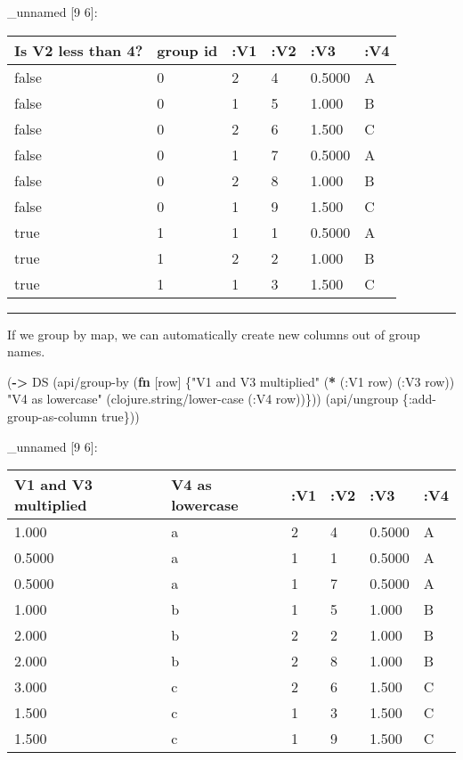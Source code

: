 \documentclass[]{article}
\newenvironment{Shaded}{\begin{snugshade}}{\end{snugshade}}
\newcommand{\KeywordTok}[1]{\textcolor[rgb]{0.13,0.29,0.53}{\textbf{#1}}}
\newcommand{\StringTok}[1]{\textcolor[rgb]{0.31,0.60,0.02}{#1}}
\newcommand{\VariableTok}[1]{\textcolor[rgb]{0.00,0.00,0.00}{#1}}
\newcommand{\AttributeTok}[1]{\textcolor[rgb]{0.77,0.63,0.00}{#1}}
\newcommand{\NormalTok}[1]{#1}
\begin{document}
\_unnamed {[}9 6{]}:

\begin{longtable}[]{@{}llllll@{}}
\toprule
Is V2 less than 4? & group id & :V1 & :V2 & :V3 & :V4\tabularnewline
\midrule
\endhead
false & 0 & 2 & 4 & 0.5000 & A\tabularnewline
false & 0 & 1 & 5 & 1.000 & B\tabularnewline
false & 0 & 2 & 6 & 1.500 & C\tabularnewline
false & 0 & 1 & 7 & 0.5000 & A\tabularnewline
false & 0 & 2 & 8 & 1.000 & B\tabularnewline
false & 0 & 1 & 9 & 1.500 & C\tabularnewline
true & 1 & 1 & 1 & 0.5000 & A\tabularnewline
true & 1 & 2 & 2 & 1.000 & B\tabularnewline
true & 1 & 1 & 3 & 1.500 & C\tabularnewline
\bottomrule
\end{longtable}

\begin{center}\rule{0.5\linewidth}{0.5pt}\end{center}

If we group by map, we can automatically create new columns out of group
names.

\begin{Shaded}
\begin{Highlighting}[]
\NormalTok{(}\KeywordTok{->}\NormalTok{ DS}
\NormalTok{    (api/group-by (}\KeywordTok{fn}\NormalTok{ [row] \{}\StringTok{"V1 and V3 multiplied"}\NormalTok{ (}\KeywordTok{*}\NormalTok{ (}\AttributeTok{:V1}\NormalTok{ row)}
\NormalTok{                                                      (}\AttributeTok{:V3}\NormalTok{ row))}
                            \StringTok{"V4 as lowercase"}\NormalTok{ (clojure.string/lower-case (}\AttributeTok{:V4}\NormalTok{ row))\}))}
\NormalTok{    (api/ungroup \{}\AttributeTok{:add-group-as-column} \VariableTok{true}\NormalTok{\}))}
\end{Highlighting}
\end{Shaded}

\_unnamed {[}9 6{]}:

\begin{longtable}[]{@{}llllll@{}}
\toprule
V1 and V3 multiplied & V4 as lowercase & :V1 & :V2 & :V3 &
:V4\tabularnewline
\midrule
\endhead
1.000 & a & 2 & 4 & 0.5000 & A\tabularnewline
0.5000 & a & 1 & 1 & 0.5000 & A\tabularnewline
0.5000 & a & 1 & 7 & 0.5000 & A\tabularnewline
1.000 & b & 1 & 5 & 1.000 & B\tabularnewline
2.000 & b & 2 & 2 & 1.000 & B\tabularnewline
2.000 & b & 2 & 8 & 1.000 & B\tabularnewline
3.000 & c & 2 & 6 & 1.500 & C\tabularnewline
1.500 & c & 1 & 3 & 1.500 & C\tabularnewline
1.500 & c & 1 & 9 & 1.500 & C\tabularnewline
\bottomrule
\end{longtable}
\end{document}
